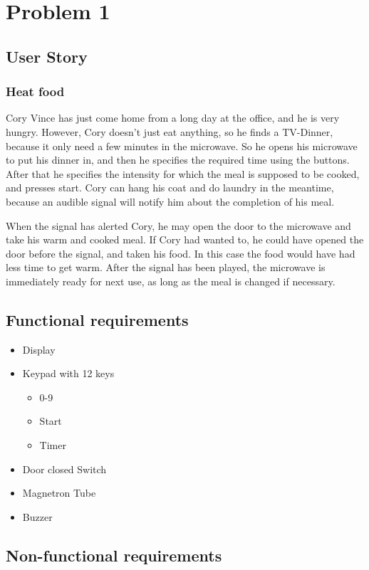 \chapter{Problem 1}
\label{chp:intro}
\section{User Story}
\subsection{Heat food}
Cory Vince has just come home from a long day at the office, and he is very hungry. However, Cory doesn’t just eat anything, so he finds a TV-Dinner, because it only need a few minutes in the microwave. So he opens his microwave to put his dinner in, and then he specifies the required time using the buttons. After that he specifies the intensity for which the meal is supposed to be cooked, and presses start. Cory can hang his coat and do laundry in the meantime, because an audible signal will notify him about the completion of his meal.

When the signal has alerted Cory, he may open the door to the microwave and take his warm and cooked meal. If Cory had wanted to, he could have opened the door before the signal, and taken his food. In this case the food would have had less time to get warm. After the signal has been played, the microwave is immediately ready for next use, as long as the meal is changed if necessary.

\section{Functional requirements}

\begin{itemize}
	\item Display
	\item Keypad with 12 keys
	\begin{itemize}
		\item 0-9
		\item Start
		\item Timer
	\end{itemize}
	\item Door closed Switch
	\item Magnetron Tube
	\item Buzzer
\end{itemize}

\section{Non-functional requirements}
